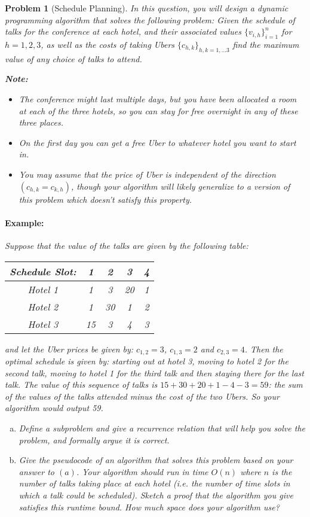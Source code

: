 \documentclass[10pt]{article}
\newtheorem{problem}{\sc\color{cit}Problem}
\begin{document}
\begin{problem}[Schedule Planning]

\noindent
In this question, you will design a dynamic programming algorithm that solves the following problem: Given the schedule of talks for the conference at each hotel, and their associated values $\{v_{i,h}\}_{i=1}^n$ for $h=1,2,3$, as well as the costs of taking Ubers $\{c_{h,k}\}_{h,k =1,...3}$ find the maximum value of any choice of talks to attend.

\noindent \textbf{Note:} 
\begin{itemize}
    \item The conference might last multiple days, but you have been allocated a room at each of the three hotels, so you can stay for free overnight in any of these three places.
    \item On the first day you can get a free Uber to whatever hotel you want to start in.
    \item You may assume that the price of Uber is independent of the direction $(c_{h,k} = c_{k,h})$, though your algorithm will likely generalize to a version of this problem which doesn't satisfy this property.
\end{itemize} 

\paragraph{Example:} Suppose that the value of the talks are given by the following table:
\begin{center}
\begin{tabular}{|c|c c c c |}\hline
    Schedule Slot: & 1 & 2 & 3 & 4  \\\hline
    Hotel 1 &  1 & 3 & 20 & 1\\
    Hotel 2 &  1 & 30 & 1 & 2\\
    Hotel 3 &  15 & 3 & 4 & 3 \\\hline
\end{tabular}
\end{center}
and let the Uber prices be given by: $c_{1,2} = 3$, $c_{1,3} = 2$ and $c_{2,3} = 4$. Then the optimal schedule is given by: starting out at hotel 3, moving to hotel 2 for the second talk, moving to hotel 1 for the third talk and then staying there for the last talk. The value of this sequence of talks is $15+30+20+1-4-3=59$: the sum of the values of the talks attended minus the cost of the two Ubers. So your algorithm would output 59.

\begin{enumerate}[(a)]
    \item Define a subproblem and give a recurrence relation that will help you solve the problem, and formally argue it is correct.
    \item Give the pseudocode of an algorithm that solves this problem based on your answer to $(a)$. Your algorithm should run in time $O(n)$ where $n$ is the number of talks taking place at each hotel (i.e. the number of time slots in which a talk could be scheduled). Sketch a proof that the algorithm you give satisfies this runtime bound. How much space does your algorithm use?
\end{enumerate}

\end{problem}
\end{document}

